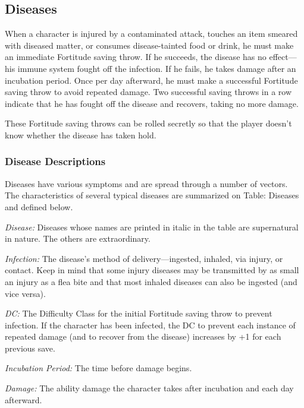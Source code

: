\subsection{Diseases}
When a character is injured by a contaminated attack, touches an item smeared with diseased matter, or consumes disease-tainted food or drink, he must make an immediate Fortitude saving throw. If he succeeds, the disease has no effect---his immune system fought off the infection. If he fails, he takes damage after an incubation period. Once per day afterward, he must make a successful Fortitude saving throw to avoid repeated damage. Two successful saving throws in a row indicate that he has fought off the disease and recovers, taking no more damage.

These Fortitude saving throws can be rolled secretly so that the player doesn't know whether the disease has taken hold.

\subsubsection{Disease Descriptions}
Diseases have various symptoms and are spread through a number of vectors. The characteristics of several typical diseases are summarized on Table: Diseases and defined below.

\textit{Disease:} Diseases whose names are printed in italic in the table are supernatural in nature. The others are extraordinary.

\textit{Infection:} The disease's method of delivery---ingested, inhaled, via injury, or contact. Keep in mind that some injury diseases may be transmitted by as small an injury as a flea bite and that most inhaled diseases can also be ingested (and vice versa).

\textit{DC:} The Difficulty Class for the initial Fortitude saving throw to prevent infection. If the character has been infected, the DC to prevent each instance of repeated damage (and to recover from the disease) increases by +1 for each previous save.

\textit{Incubation Period:} The time before damage begins.

\textit{Damage:} The ability damage the character takes after incubation and each day afterward.

